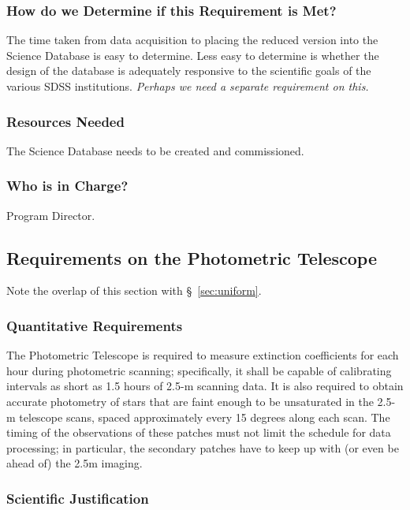 \subsubsection{How do we Determine if this Requirement is Met?}

The time taken from data acquisition to placing the reduced version into 
the Science Database is easy to determine. Less easy to determine is 
whether the design of the database is adequately responsive to the scientific 
goals of the various SDSS institutions. {\it Perhaps we need a
separate requirement on this.}

\subsubsection{Resources Needed}

The Science Database needs to be created and commissioned. 

\subsubsection{Who is in Charge?}

Program Director. 


\subsection{Requirements on the Photometric Telescope}
Note the overlap of this section with \S~\ref{sec:uniform}. 
\subsubsection{Quantitative Requirements}

The Photometric Telescope is required to measure extinction coefficients for 
each hour during photometric scanning; specifically, it shall be capable of 
calibrating intervals as short as 1.5 hours of 2.5-m scanning data.  It is also 
required to obtain accurate photometry of stars that are faint enough
to be unsaturated  in the 2.5-m telescope scans, spaced approximately
every 15 degrees along  each scan.  The timing of the observations of
these patches must not limit  the schedule for data processing; in
particular, the secondary patches have to keep up with (or even be
ahead of) the 2.5m imaging. 

\subsubsection{Scientific Justification}

